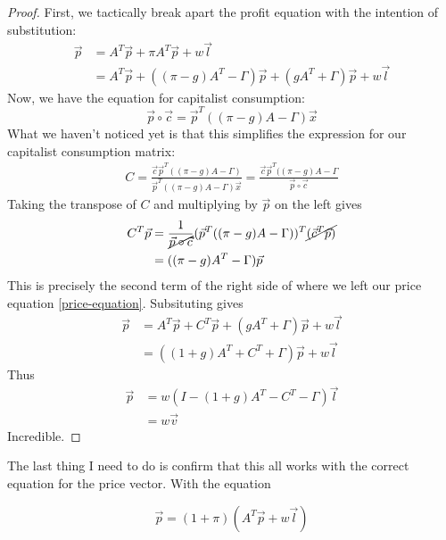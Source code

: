 \documentclass{article}
\theoremstyle{definition}
\begin{document}
\begin{proof}
    First, we tactically break apart the profit equation with the intention of substitution:
    \begin{align}\label{price-equation}
        \vec{p} &= A^T\vec{p}+\pi A^T\vec{p}+w\vec{l} \\
                &= A^T\vec{p}+((\pi-g)A^T-\Gamma)\vec{p}+(gA^T+\Gamma)\vec{p}+w\vec{l}
    \end{align}
    Now, we have the equation for capitalist consumption:
    \begin{equation}
        \vec{p}\circ \vec{c} = \vec{p}^T((\pi-g)A-\Gamma)\vec{x}
    \end{equation}
    What we haven't noticed yet is that this simplifies the expression for our capitalist consumption matrix:
    \begin{align}
        C = \frac{\vec{c}\vec{p}^T((\pi-g)A-\Gamma)}{\vec{p}^T((\pi-g)A-\Gamma)\vec{x}} = \frac{\vec{c}\vec{p}^T((\pi-g)A-\Gamma}{\vec{p}\circ \vec{c}}
    \end{align}
    Taking the transpose of $C$ and multiplying by $\vec{p}$ on the left gives
    \begin{align}
        C^T\vec{p} &= \frac{1}{\cancel{\vec{p}\circ \vec{c}}}(\vec{p}^T((\pi-g)A-\Gamma))^T\cancel{(\vec{c}^T\vec{p})} \\
                   &= ((\pi-g)A^T-\Gamma)\vec{p}
    \end{align}
    This is precisely the second term of the right side of where we left our price equation \ref{price-equation}. Subsituting gives
    \begin{align}
        \vec{p} &= A^T\vec{p}+C^T\vec{p}+(gA^T+\Gamma)\vec{p}+w\vec{l} \\
                &= ((1+g)A^T+C^T+\Gamma)\vec{p}+w\vec{l}
    \end{align}
    Thus
    \begin{align}
        \vec{p} &= w(I-(1+g)A^T-C^T-\Gamma)\vec{l} \\
                &= w\vec{v}
    \end{align}
    Incredible. 
\end{proof}

The last thing I need to do is confirm that this all works with the correct equation for the price vector. With the equation

\begin{equation}
    \vec{p} = (1+\pi)(A^T\vec{p}+w\vec{l})
\end{equation}
\end{document}
